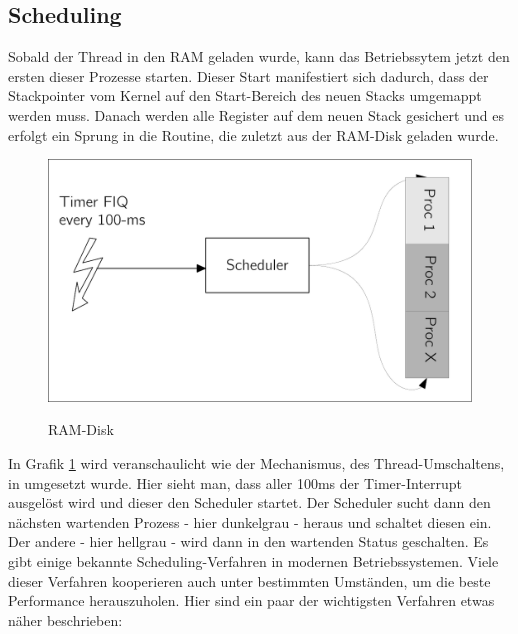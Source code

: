 \subsection{Scheduling}
Sobald der Thread in den RAM geladen wurde, kann das Betriebssytem jetzt den ersten dieser Prozesse starten. Dieser Start manifestiert sich dadurch, dass der Stackpointer vom Kernel auf den Start-Bereich des neuen Stacks umgemappt werden muss. Danach werden alle Register auf dem neuen Stack gesichert und es erfolgt ein Sprung in die Routine, die zuletzt aus der RAM-Disk geladen wurde. 
\begin{figure}[H]
	\begin{center}	
	\caption{RAM-Disk}
	\includegraphics[scale=0.60]{common/scheduler.pdf}
	\label{scheduler}
	\end{center}
\end{figure}
\noindent
In Grafik \ref{scheduler} wird veranschaulicht wie der Mechanismus, des Thread-Umschaltens, in \mops umgesetzt wurde. Hier sieht man, dass aller 100ms der Timer-Interrupt ausgel\"ost wird und dieser  den Scheduler startet. Der Scheduler sucht dann den n\"achsten wartenden Prozess - hier dunkelgrau - heraus und schaltet diesen ein. Der andere - hier hellgrau - wird dann in den wartenden Status geschalten.
Es gibt einige bekannte Scheduling-Verfahren in modernen Betriebssystemen. Viele dieser Verfahren kooperieren auch unter bestimmten Umst\"anden, um die beste Performance herauszuholen. Hier sind ein paar der wichtigsten Verfahren etwas n\"aher beschrieben:
